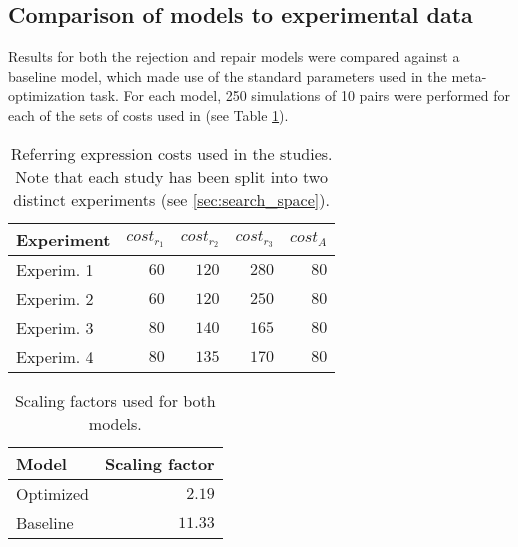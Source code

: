 \documentclass[11pt]{article}
\begin{document}
\subsection{Comparison of models to experimental data}
\label{sec:model_comparison}
Results for both the rejection and repair models were compared against a baseline model, which made use of the standard parameters used in the meta-optimization task. For each model, 250 simulations of 10 pairs were performed for each of the sets of costs used in \citeauthor{rohde2012} (see Table \ref{table:2}).
\begin{table}[]
\begin{center}
    \begin{tabular}{ l r r r r }
    Experiment & $cost_{r_1}$ & $cost_{r_2}$ & $cost_{r_3}$ & $cost_A$\\ \hline
    Experim. 1 & $60$ & $120$ & $280$ & $80$ \\ \hline
    Experim. 2 & $60$ & $120$ & $250$ & $80$ \\ \hline
    Experim. 3 & $80$ & $140$ & $165$ & $80$ \\ \hline
    Experim. 4 & $80$ & $135$ & $170$ & $80$ \\ 
    \end{tabular}
    \caption{Referring expression costs used in the \citeauthor{rohde2012} studies. Note that each study has 	    been split into two distinct experiments (see \ref{sec:search_space}).}
    \label{table:2}
\end{center}
\end{table}

\begin{table}
\begin{center}
    \begin{tabular}{ l r }
    Model & Scaling factor \\ \hline
    Optimized & $2.19$ \\ \hline
    Baseline & $11.33$ \\ \hline
    \end{tabular}
    \caption{Scaling factors used for both models.}
    \label{table:3}
\end{center}
\end{table}

\end{document}
